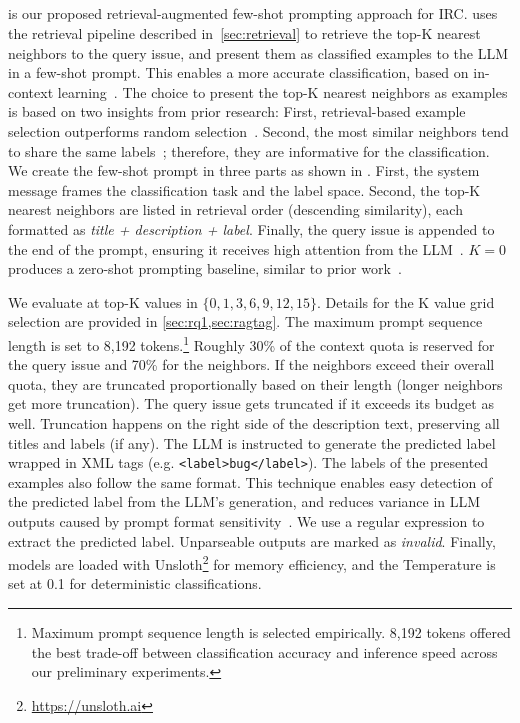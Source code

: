 \subsection{\ragtag}
\label{sec:approach-ragtag}
\ragtag is our proposed retrieval-augmented few-shot prompting approach for IRC. \ragtag uses the retrieval pipeline described in~\cref{sec:retrieval} to retrieve the top-K nearest neighbors to the query issue, and present them as classified examples to the LLM in a few-shot prompt. This enables a more accurate classification, based on in-context
learning~\cite{brown2020language}. The choice to present the top-K nearest neighbors as examples is based on two insights from prior research: First, retrieval-based example selection outperforms random selection~\cite{liu2022makes}. Second, the most similar neighbors tend to share the same labels~\cite{cover1967nearest}; therefore, they are informative for the classification.
We create the few-shot prompt in three parts as shown in . First, the system message frames the classification task and the label space. Second, the top-K nearest neighbors are listed in retrieval order (descending similarity), each formatted as \textit{title + description + label}. Finally, the query issue is appended to the end of the prompt, ensuring it receives high attention from the LLM~\cite{liu2024lost}. $K=0$ produces a zero-shot prompting baseline, similar to prior work~\cite{colavito2025benchmarking}.

We evaluate \ragtag at top-K values in $\{0, 1, 3, 6, 9, 12, 15\}$. Details for the K value grid selection are provided in \cref{sec:rq1,sec:ragtag}. The maximum prompt sequence length is set to 8,192 tokens.\footnote{Maximum prompt sequence length is selected empirically. 8,192 tokens offered the best trade-off between classification accuracy and inference speed across our preliminary experiments.} Roughly 30\% of the context quota is reserved for the query issue and 70\% for the neighbors. If the neighbors exceed their overall quota, they are truncated proportionally based on their length (longer neighbors get more truncation). The query issue gets truncated if it exceeds its budget as well. Truncation happens on the right side of the
description text, preserving all titles and labels (if any).
The LLM is instructed to generate the predicted label wrapped in XML tags (e.g. \texttt{<label>bug</label>}). The labels of the presented examples also follow the same format. This technique enables easy detection of the predicted label from the LLM's generation, and reduces variance in LLM outputs caused by prompt format sensitivity~\cite{sclar2023quantifying}. We use a regular expression to extract the predicted label. Unparseable outputs are marked as \textit{invalid}. Finally, models are loaded with Unsloth\footnote{\url{https://unsloth.ai}} for memory efficiency, and the Temperature is set at 0.1 for deterministic classifications.
